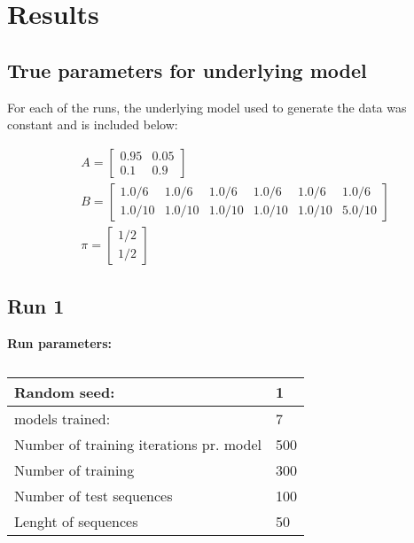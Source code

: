 \section{Results}


\subsection{True parameters for underlying model}
For each of the runs, the underlying model used to generate the data was constant and is included below:


\begin{align}
    & A = 
    \begin{bmatrix}
        0.95 & 0.05 \\
        0.1  & 0.9
    \end{bmatrix} \\
    & B =
    \begin{bmatrix}
        1.0/6 & 1.0/6 & 1.0/6 & 1.0/6 & 1.0/6 & 1.0/6\\
        1.0/10 &  1.0/10 & 1.0/10 & 1.0/10 & 1.0/10 & 5.0/10
    \end{bmatrix}\\
    & \pi = 
    \begin{bmatrix}
        1/2 \\
        1/2
    \end{bmatrix}
\end{align}


\subsection{Run 1}
\textbf{Run parameters:} \\
\begin{table}[]
    \begin{tabular}{@{}ll@{}}
        \toprule
        Random seed:                            & 1   \\ \midrule
        models trained:                         & 7   \\
        Number of training iterations pr. model & 500 \\
        Number of training                      & 300 \\
        Number of test sequences                & 100 \\
        Lenght of sequences                     & 50  \\ \bottomrule
    \end{tabular}
    \caption{}
    \label{tab:my-table}
\end{table}

